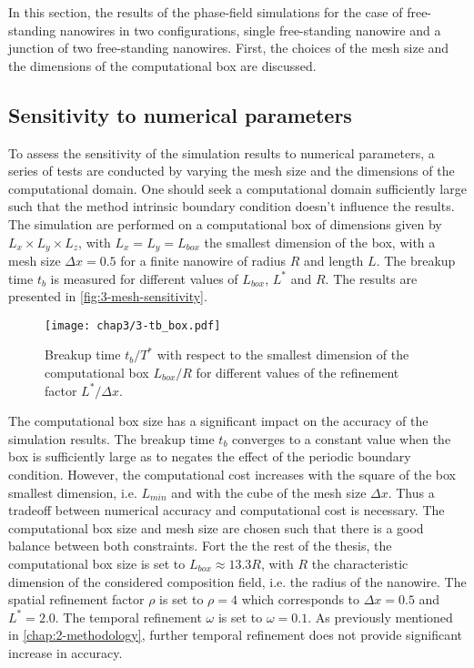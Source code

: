In this section, the results of the phase-field simulations for the case of free-standing nanowires in two configurations, single free-standing nanowire and a junction of two free-standing nanowires. First, the choices of the mesh size and the dimensions of the computational box are discussed.

\subsection{Sensitivity to numerical parameters}
To assess the sensitivity of the simulation results to numerical parameters, a series of tests are conducted by varying the mesh size and the dimensions of the computational domain. One should seek a computational domain sufficiently large such that the method intrinsic boundary condition doesn't influence the results. The simulation are performed on a computational box of dimensions given by $L_x\times L_y\times L_z$, with $L_x=L_y=L_{box}$ the smallest dimension of the box, with a mesh size $\Delta x=0.5$ for a finite nanowire of radius $R$ and length $L$. The breakup time $t_b$ is measured for different values of $L_{box}$, $L^*$ and $R$. The results are presented in \autoref{fig:3-mesh-sensitivity}.

\begin{figure}[H]
    \centering
    \texttt{[image: chap3/3-tb\_box.pdf]}
    \caption{Breakup time $t_b/T^*$ with respect to the smallest dimension of the computational box $L_{box} / R$ for different values of the refinement factor $L^*/\Delta x$.}
    \label{fig:3-mesh-sensitivity}
\end{figure}

The computational box size has a significant impact on the accuracy of the simulation results. The breakup time $t_b$ converges to a constant value when the box is sufficiently large as to negates the effect of the periodic boundary condition. However, the computational cost increases with the square of the box smallest dimension, i.e. $L_{min}$ and with the cube of the mesh size $\Delta x$. 
Thus a tradeoff between numerical accuracy and computational cost is necessary. The computational box size and mesh size are chosen such that there is a good balance between both constraints.
Fort the the rest of the thesis, the computational box size is set to $L_{box}\approx 13.3 R$, with $R$ the characteristic dimension of the considered composition field, i.e. the radius of the nanowire. The spatial refinement factor $\rho$ is set to $\rho=4$ which corresponds to $\Delta x=0.5$ and $L^*=2.0$. The temporal refinement $\omega$ is set to $\omega=0.1$. As previously mentioned in \autoref{chap:2-methodology}, further temporal refinement does not provide significant increase in accuracy.

